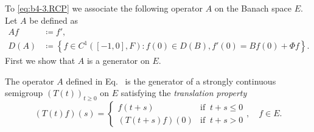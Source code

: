 To \eqref{eq:b4-3.RCP} we associate the following operator $A$ on the Banach space $E$.
Let $A$ be defined as
\begin{equation}\label{eq:b4-3.1}
	\begin{aligned}
		Af & \coloneq  f'  ,\\
		D(A) & \coloneq  \left\{f \in C^1([-1,0],F) \colon f(0) \in D(B), f'(0) = Bf(0) + \Phi f\right\} .
	\end{aligned}
\end{equation}
First we show that $A$ is a generator on $E$.
\begin{theorem}\label{thm:b4-3.1}
	The operator $A$ defined in Eq.~ is the generator of a strongly continuous semigroup $(T(t))_{t\geq 0}$ on $E$ satisfying the \emph{translation property}
\begin{equation*}\label{eq:b4-3.T} \tag{T}
    (T(t)f)(s) = 
    \begin{cases} 
        f(t+s) & \text{if } \ t+s \leq 0 \\
        (T(t+s)f)(0) & \text{if } \ t+s  >  0 
    \end{cases}, \quad f \in E .
\end{equation*}
\end{theorem}
